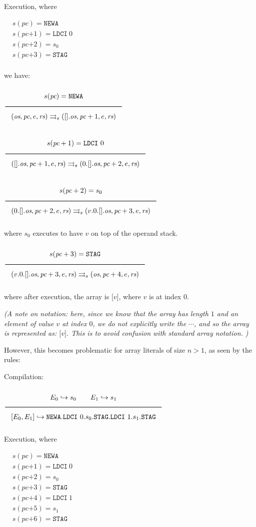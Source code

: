 Execution, where

$\begin{aligned}
& s(\textit{pc}) = \texttt{NEWA}\\
& s(\textit{pc+1}) = \texttt{LDCI}\ 0\\
& s(\textit{pc+2}) = s_0\\
& s(\textit{pc+3}) = \texttt{STAG}\\
\end{aligned}$

we have:

$\Rule{s(\textit{pc}) = \texttt{NEWA}}{
(\textit{os},\textit{pc},e,\textit{rs}) \transition
(\lbrack\rbrack.\textit{os},\textit{pc}+1,e,\textit{rs})}
$

$\Rule{s(\textit{pc}+1) = \texttt{LDCI}\ 0}{
(\lbrack\rbrack.\textit{os},\textit{pc}+1,e,\textit{rs}) \transition
(0.\lbrack\rbrack.\textit{os},\textit{pc}+2,e,\textit{rs})}
$

$\Rule{s(\textit{pc}+2) = s_0}{
(0.\lbrack\rbrack.\textit{os},\textit{pc}+2,e,\textit{rs}) \transition
(v.0.\lbrack\rbrack.\textit{os},\textit{pc}+3,e,\textit{rs})}
$

where $s_0$ executes to have $v$ on top of the operand stack.

$\Rule{s(\textit{pc}+3) = \texttt{STAG}}{
(v.0.\lbrack\rbrack.\textit{os},\textit{pc}+3,e,\textit{rs}) \transition
(\textit{os},\textit{pc}+4,e,\textit{rs})}
$

where after execution, the array is $\lbrack v \rbrack$, where $v$ is at index $0$.

\textit{(A note on notation: here, since we know that the array has length $1$ and an element of value $v$ at index $0$, we do not explicitly write the $\cdots$, and so the array is represented as: $\lbrack v \rbrack$. This is to avoid confusion with standard array notation.
)}

However, this becomes problematic for array literals of size $n > 1$, as seen by the rules:

Compilation:

$\Rule{E_0 \translateaux s_0 \qquad E_1 \translateaux s_1}{
\lbrack E_0, E_1 \rbrack \translateaux \texttt{NEWA}
.\texttt{LDCI}\ 0.s_0.\texttt{STAG}
.\texttt{LDCI}\ 1.s_1.\texttt{STAG}}
$

Execution, where

$\begin{aligned}
& s(\textit{pc}) = \texttt{NEWA}\\
& s(\textit{pc+1}) = \texttt{LDCI}\ 0\\
& s(\textit{pc+2}) = s_0\\
& s(\textit{pc+3}) = \texttt{STAG}\\
& s(\textit{pc+4}) = \texttt{LDCI}\ 1\\
& s(\textit{pc+5}) = s_1\\
& s(\textit{pc+6}) = \texttt{STAG}\\
\end{aligned}$

